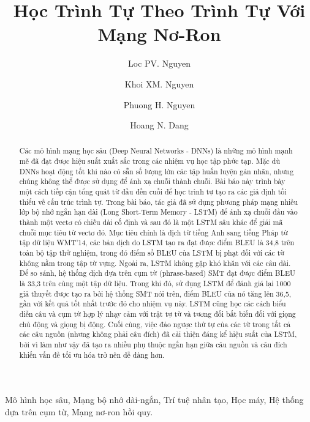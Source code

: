\begin{frontmatter}
\title{Học Trình Tự Theo Trình Tự Với Mạng Nơ-Ron}
\author{Loc PV. Nguyen}
\author{Khoi XM. Nguyen}
\author{Phuong H. Nguyen}
\author{Hoang N. Dang}
\address{Faculty of Information Technology, FPT University Global Education, Ho Chi Minh city, Vietnam}

\begin{abstract}
Các mô hình mạng học sâu (Deep Neural Networks - DNNs) là những mô hình mạnh mẽ đã đạt được hiệu suất xuất sắc trong các nhiệm vụ học tập phức tạp. Mặc dù DNNs hoạt động tốt khi nào có sẵn số lượng lớn các tập huấn luyện gán nhãn, nhưng chúng không thể được sử dụng để ánh xạ chuỗi thành chuỗi. Bài báo này trình bày một cách tiếp cận tổng quát từ đầu đến cuối để học trình tự tạo ra các giả định tối thiểu về cấu trúc trình tự. Trong bài báo, tác giả đã sử dụng phương pháp mạng nhiều lớp bộ nhớ ngắn hạn dài (Long Short-Term Memory - LSTM) để ánh xạ chuỗi đầu vào thành một vectơ có chiều dài cố định và sau đó là một LSTM sâu khác để giải mã chuỗi mục tiêu từ vectơ đó. Mục tiêu chính là dịch từ tiếng Anh sang tiếng Pháp từ tập dữ liệu WMT’14, các bản dịch do LSTM tạo ra đạt được điểm BLEU là 34,8 trên toàn bộ tập thử nghiệm, trong đó điểm số BLEU của LSTM bị phạt đối với các từ không nằm trong tập từ vựng. Ngoài ra, LSTM không gặp khó khăn với các câu dài. Để so sánh, hệ thống dịch dựa trên cụm từ (phrase-based) SMT đạt được điểm BLEU là 33,3 trên cùng một tập dữ liệu. Trong khi đó, sử dụng LSTM để đánh giá lại 1000 giả thuyết được tạo ra bởi hệ thống SMT nói trên, điểm BLEU của nó tăng lên 36,5, gần với kết quả tốt nhất trước đó cho nhiệm vụ này. LSTM cũng học các cách biểu diễn câu và cụm từ hợp lý nhạy cảm với trật tự từ và tương đối bất biến đối với giọng chủ động và giọng bị động. Cuối cùng, việc đảo ngược thứ tự của các từ trong tất cả các câu nguồn (nhưng không phải câu đích) đã cải thiện đáng kể hiệu suất của LSTM, bởi vì làm như vậy đã tạo ra nhiều phụ thuộc ngắn hạn giữa câu nguồn và câu đích khiến vấn đề tối ưu hóa trở nên dễ dàng hơn.
\end{abstract}
\begin{keyword}
Mô hình học sâu, Mạng bộ nhớ dài-ngắn, Trí tuệ nhân tạo, Học máy, Hệ thống dựa trên cụm từ, Mạng nơ-ron hồi quy.
\end{keyword}

\end{frontmatter}
